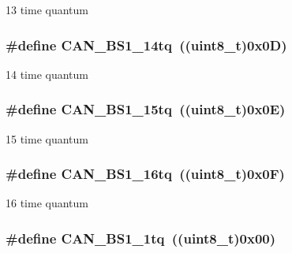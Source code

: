 \label{group__CAN__time__quantum__in__bit__segment__1_ga2087caec94be44837c1e6965da7f6236}
13 time quantum \hypertarget{group__CAN__time__quantum__in__bit__segment__1_gac0c71e1020a4fbaf66bce754bd54d8cb}{
\subsubsection[{CAN\_\-BS1\_\-14tq}]{\setlength{\rightskip}{0pt plus 5cm}\#define CAN\_\-BS1\_\-14tq~((uint8\_\-t)0x0D)}}
\label{group__CAN__time__quantum__in__bit__segment__1_gac0c71e1020a4fbaf66bce754bd54d8cb}
14 time quantum \hypertarget{group__CAN__time__quantum__in__bit__segment__1_gaa52c8674dc7caae1089e5276cd13db5f}{
\subsubsection[{CAN\_\-BS1\_\-15tq}]{\setlength{\rightskip}{0pt plus 5cm}\#define CAN\_\-BS1\_\-15tq~((uint8\_\-t)0x0E)}}
\label{group__CAN__time__quantum__in__bit__segment__1_gaa52c8674dc7caae1089e5276cd13db5f}
15 time quantum \hypertarget{group__CAN__time__quantum__in__bit__segment__1_ga3be52c699f5618cc318c143ee42f5966}{
\subsubsection[{CAN\_\-BS1\_\-16tq}]{\setlength{\rightskip}{0pt plus 5cm}\#define CAN\_\-BS1\_\-16tq~((uint8\_\-t)0x0F)}}
\label{group__CAN__time__quantum__in__bit__segment__1_ga3be52c699f5618cc318c143ee42f5966}
16 time quantum \hypertarget{group__CAN__time__quantum__in__bit__segment__1_ga76b8fb0815b7a3f398fffe72dda0bc04}{
\subsubsection[{CAN\_\-BS1\_\-1tq}]{\setlength{\rightskip}{0pt plus 5cm}\#define CAN\_\-BS1\_\-1tq~((uint8\_\-t)0x00)}}
